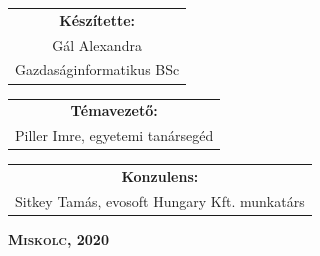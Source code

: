 \vspace*{2.5truecm}
{\large
\begin{center}
\begin{tabular}{c}
\textbf{Készítette:}\\
Gál Alexandra\\
Gazdaságinformatikus BSc
\end{tabular}
\end{center}
\begin{center}
\begin{tabular}{c}
\textbf{Témavezető:}\\
Piller Imre, egyetemi tanársegéd
\end{tabular}
\end{center}
\begin{center}
\begin{tabular}{c}
\textbf{Konzulens:}\\
Sitkey Tamás, evosoft Hungary Kft. munkatárs
\end{tabular}
\end{center}}
\vfill
{\large
\begin{center}
\textbf{\textsc{Miskolc, 2020}}
\end{center}}

\newpage
